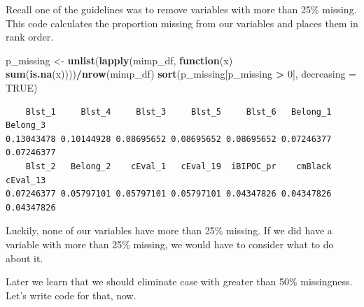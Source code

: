 \documentclass[
  11pt,
]{book}
\newenvironment{Shaded}{\begin{snugshade}}{\end{snugshade}}
\newcommand{\AttributeTok}[1]{\textcolor[rgb]{0.27,0.27,0.27}{#1}}
\newcommand{\CommentTok}[1]{\textcolor[rgb]{0.37,0.37,0.37}{\textit{#1}}}
\newcommand{\ConstantTok}[1]{\textcolor[rgb]{0.37,0.37,0.37}{#1}}
\newcommand{\ControlFlowTok}[1]{\textcolor[rgb]{0.27,0.27,0.27}{\textbf{#1}}}
\newcommand{\DecValTok}[1]{\textcolor[rgb]{0.06,0.06,0.06}{#1}}
\newcommand{\FunctionTok}[1]{\textcolor[rgb]{0.27,0.27,0.27}{\textbf{#1}}}
\newcommand{\NormalTok}[1]{#1}
\newcommand{\OtherTok}[1]{\textcolor[rgb]{0.37,0.37,0.37}{#1}}
\newcommand{\SpecialCharTok}[1]{\textcolor[rgb]{0.43,0.43,0.43}{\textbf{#1}}}
\begin{document}
Recall one of the guidelines was to remove variables with more than 25\% missing. This code calculates the proportion missing from our variables and places them in rank order.

\begin{Shaded}
\begin{Highlighting}[]
\NormalTok{p\_missing }\OtherTok{\textless{}{-}} \FunctionTok{unlist}\NormalTok{(}\FunctionTok{lapply}\NormalTok{(mimp\_df, }\ControlFlowTok{function}\NormalTok{(x) }\FunctionTok{sum}\NormalTok{(}\FunctionTok{is.na}\NormalTok{(x))))}\SpecialCharTok{/}\FunctionTok{nrow}\NormalTok{(mimp\_df)}
\FunctionTok{sort}\NormalTok{(p\_missing[p\_missing }\SpecialCharTok{\textgreater{}} \DecValTok{0}\NormalTok{], }\AttributeTok{decreasing =} \ConstantTok{TRUE}\NormalTok{)}
\end{Highlighting}
\end{Shaded}

\begin{verbatim}
    Blst_1     Blst_4     Blst_3     Blst_5     Blst_6   Belong_1   Belong_3 
0.13043478 0.10144928 0.08695652 0.08695652 0.08695652 0.07246377 0.07246377 
    Blst_2   Belong_2    cEval_1   cEval_19  iBIPOC_pr    cmBlack   cEval_13 
0.07246377 0.05797101 0.05797101 0.05797101 0.04347826 0.04347826 0.04347826 
\end{verbatim}

Luckily, none of our variables have more than 25\% missing. If we did have a variable with more than 25\% missing, we would have to consider what to do about it.

Later we learn that we should eliminate case with greater than 50\% missingness. Let's write code for that, now.

\begin{Shaded}
\end{Shaded}
\end{document}
